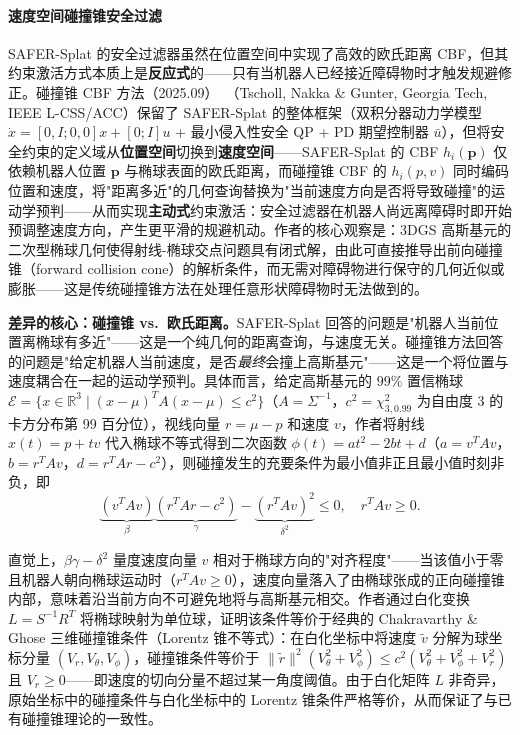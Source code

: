 \paragraph{速度空间碰撞锥安全过滤}

SAFER-Splat 的安全过滤器虽然在位置空间中实现了高效的欧氏距离 CBF，但其约束激活方式本质上是\textbf{反应式}的——只有当机器人已经接近障碍物时才触发规避修正。碰撞锥 CBF 方法（2025.09）~\cite{2509_14421}（Tscholl, Nakka \& Gunter, Georgia Tech, IEEE L-CSS/ACC）保留了 SAFER-Splat 的整体框架（双积分器动力学模型 $\dot{x} = [0, I; 0, 0]x + [0; I]u$ + 最小侵入性安全 QP + PD 期望控制器 $\bar{u}$），但将安全约束的定义域从\textbf{位置空间}切换到\textbf{速度空间}——SAFER-Splat 的 CBF $h_i(\mathbf{p})$ 仅依赖机器人位置 $\mathbf{p}$ 与椭球表面的欧氏距离，而碰撞锥 CBF 的 $h_i(p,v)$ 同时编码位置和速度，将"距离多近"的几何查询替换为"当前速度方向是否将导致碰撞"的运动学预判——从而实现\textbf{主动式}约束激活：安全过滤器在机器人尚远离障碍时即开始预调整速度方向，产生更平滑的规避机动。作者的核心观察是：3DGS 高斯基元的二次型椭球几何使得射线-椭球交点问题具有闭式解，由此可直接推导出前向碰撞锥（forward collision cone）的解析条件，而无需对障碍物进行保守的几何近似或膨胀——这是传统碰撞锥方法在处理任意形状障碍物时无法做到的。

\textbf{差异的核心：碰撞锥 vs.\ 欧氏距离。}SAFER-Splat 回答的问题是"机器人当前位置离椭球有多近"——这是一个纯几何的距离查询，与速度无关。碰撞锥方法回答的问题是"给定机器人当前速度，是否\emph{最终}会撞上高斯基元"——这是一个将位置与速度耦合在一起的运动学预判。具体而言，给定高斯基元的 $99\%$ 置信椭球 $\mathcal{E} = \{x \in \mathbb{R}^3 \mid (x-\mu)^T A (x-\mu) \leq c^2\}$（$A=\Sigma^{-1}$，$c^2 = \chi^2_{3,0.99}$ 为自由度 3 的卡方分布第 99 百分位），视线向量 $r = \mu - p$ 和速度 $v$，作者将射线 $x(t) = p + tv$ 代入椭球不等式得到二次函数 $\phi(t) = at^2 - 2bt + d$（$a = v^T\!Av$，$b = r^T\!Av$，$d = r^T\!Ar - c^2$），则碰撞发生的充要条件为最小值非正且最小值时刻非负，即
\begin{equation}
\underbrace{(v^T\!Av)}_{\beta}\underbrace{(r^T\!Ar - c^2)}_{\gamma} - \underbrace{(r^T\!Av)^2}_{\delta^2} \leq 0, \quad r^T\!Av \geq 0.
\end{equation}

直觉上，$\beta\gamma - \delta^2$ 量度速度向量 $v$ 相对于椭球方向的"对齐程度"——当该值小于零且机器人朝向椭球运动时（$r^T\!Av \geq 0$），速度向量落入了由椭球张成的正向碰撞锥内部，意味着沿当前方向不可避免地将与高斯基元相交。作者通过白化变换 $L = S^{-1}R^T$ 将椭球映射为单位球，证明该条件等价于经典的 Chakravarthy \& Ghose 三维碰撞锥条件（Lorentz 锥不等式）：在白化坐标中将速度 $\tilde{v}$ 分解为球坐标分量 $(V_r, V_\theta, V_\phi)$，碰撞锥条件等价于 $\|\tilde{r}\|^2(V_\theta^2 + V_\phi^2) \leq c^2(V_\theta^2 + V_\phi^2 + V_r^2)$ 且 $V_r \geq 0$——即速度的切向分量不超过某一角度阈值。由于白化矩阵 $L$ 非奇异，原始坐标中的碰撞条件与白化坐标中的 Lorentz 锥条件严格等价，从而保证了与已有碰撞锥理论的一致性。

